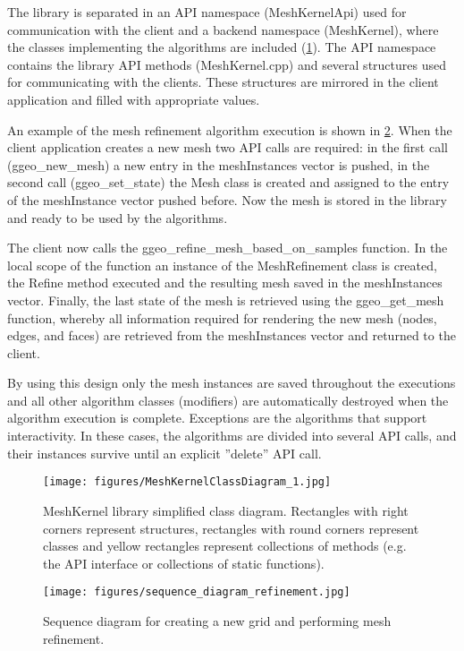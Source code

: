 \documentclass[biblatex]{deltares_manual}
\begin{document}
The library is separated in an API namespace (MeshKernelApi) used for communication with the client and a backend namespace (MeshKernel), where the classes implementing the algorithms are included (\ref{fig:classDiagram}). The API namespace contains the library API methods (MeshKernel.cpp) and several structures used for communicating with the clients. These structures are mirrored in the client application and filled with appropriate values.

An example of the mesh refinement algorithm execution is shown in \ref{fig:sequenceDiagram}. When the client application creates a new mesh two API calls are required: in the first call (ggeo\_new\_mesh) a new entry in the meshInstances vector is pushed, in the second call (ggeo\_set\_state) the Mesh class is created and assigned to the entry of the meshInstance vector pushed before. Now the mesh is stored in the library and ready to be used by the algorithms.

The client now calls the ggeo\_refine\_mesh\_based\_on\_samples function. In the local scope of the function an instance of the MeshRefinement class is created, the Refine method executed and the resulting mesh saved in the meshInstances vector. Finally, the last state of the mesh is retrieved using the ggeo\_get\_mesh function, whereby all information required for rendering the new mesh (nodes, edges, and faces) are retrieved from the meshInstances vector and returned to the client.

By using this design only the mesh instances are saved throughout the executions and all other algorithm classes (modifiers) are automatically destroyed when the algorithm execution is complete. Exceptions are the algorithms that support interactivity. In these cases, the algorithms are divided into several API calls, and their instances survive until an explicit ''delete'' API call.

\begin{figure}[H]
	\centering
	\texttt{[image: figures/MeshKernelClassDiagram\_1.jpg]}
	\caption{MeshKernel library simplified class diagram. Rectangles with right corners represent structures, rectangles with round corners represent classes and yellow rectangles represent collections of methods (e.g. the API interface or collections of static functions).}
	\label{fig:classDiagram}
\end{figure}
\begin{figure}[H]
	\centering
	\texttt{[image: figures/sequence\_diagram\_refinement.jpg]}
	\caption{Sequence diagram for creating a new grid and performing mesh refinement.}
	\label{fig:sequenceDiagram}
\end{figure}
\end{document}
